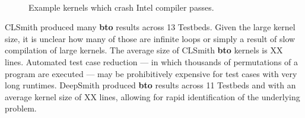\begin{figure}
  \centering
  \\%
  \\%
  \\%
  \\%
  \\%
  \\%
  \caption{Example kernels which crash Intel compiler passes.}%
  \label{lst:intel-passes}
\end{figure}



CLSmith produced many \textbf{bto} results across 13 Testbeds. Given the large kernel size, it is unclear how many of those are infinite loops or simply a result of slow compilation of large kernels. The average size of CLSmith \textbf{bto} kernels is XX lines. Automated test case reduction --- in which thousands of permutations of a program are executed --- may be prohibitively expensive for test cases with very long runtimes. DeepSmith produced \textbf{bto} results across 11 Testbeds and with an average kernel size of XX lines, allowing for rapid identification of the underlying problem.


